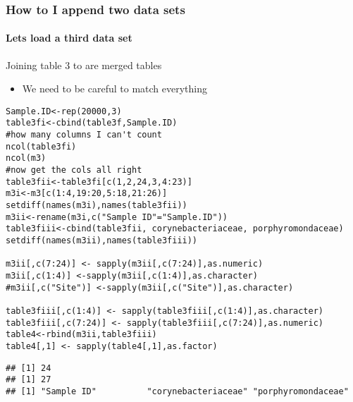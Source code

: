 \documentclass[12pt]{beamer}\usepackage[]{graphicx}\usepackage[]{color}
\makeatletter
\newenvironment{kframe}{%
 \def\at@end@of@kframe{}%
 \ifinner\ifhmode%
  \def\at@end@of@kframe{\end{minipage}}%
  \begin{minipage}{\columnwidth}%
 \fi\fi%
 \def\FrameCommand##1{\hskip\@totalleftmargin \hskip-\fboxsep
 \colorbox{shadecolor}{##1}\hskip-\fboxsep
     \hskip-\linewidth \hskip-\@totalleftmargin \hskip\columnwidth}%
 \MakeFramed {\advance\hsize-\width
   \@totalleftmargin\z@ \linewidth\hsize
   \@setminipage}}%
 {\par\unskip\endMakeFramed%
 \at@end@of@kframe}
\newenvironment{knitrout}{}{} %
\makeatother
\begin{document}
\begin{frame}[fragile]
  \frametitle{How to I append two data sets}
  \framesubtitle{Lets load a third data set}
  \begin{block}{Joining table 3 to are merged tables}
  \begin{itemize}
  \item We need to be careful to match everything
  \end{itemize}
  \end{block}
\begin{lstlisting} 
Sample.ID<-rep(20000,3)
table3fi<-cbind(table3f,Sample.ID)
#how many columns I can't count
ncol(table3fi)
ncol(m3)
#now get the cols all right
table3fii<-table3fi[c(1,2,24,3,4:23)]
m3i<-m3[c(1:4,19:20,5:18,21:26)]
setdiff(names(m3i),names(table3fii))
m3ii<-rename(m3i,c("Sample ID"="Sample.ID"))
table3fiii<-cbind(table3fii, corynebacteriaceae, porphyromondaceae)
setdiff(names(m3ii),names(table3fiii))

m3ii[,c(7:24)] <- sapply(m3ii[,c(7:24)],as.numeric)
m3ii[,c(1:4)] <-sapply(m3ii[,c(1:4)],as.character)
#m3ii[,c("Site")] <-sapply(m3ii[,c("Site")],as.character)

table3fiii[,c(1:4)] <- sapply(table3fiii[,c(1:4)],as.character)
table3fiii[,c(7:24)] <- sapply(table3fiii[,c(7:24)],as.numeric)
table4<-rbind(m3ii,table3fiii)
table4[,1] <- sapply(table4[,1],as.factor)
\end{lstlisting}
  
\begin{knitrout}
\color{fgcolor}\begin{kframe}
\begin{verbatim}
## [1] 24
## [1] 27
## [1] "Sample ID"          "corynebacteriaceae" "porphyromondaceae"
\end{verbatim}


{\ttfamily\noindent\bfseries{}}

{\ttfamily\noindent\bfseries\color{errorcolor}{\#\# Error in cbind(table3fii, corynebacteriaceae, porphyromondaceae): object 'corynebacteriaceae' not found}}

{\ttfamily\noindent\bfseries\color{errorcolor}{\#\# Error in as.vector(x): object 'm3ii' not found}}

{\ttfamily\noindent\bfseries\color{errorcolor}{\#\# Error in lapply(X = X, FUN = FUN, ...): object 'm3ii' not found}}


\end{kframe}
\end{knitrout}
\end{frame}
\end{document}
